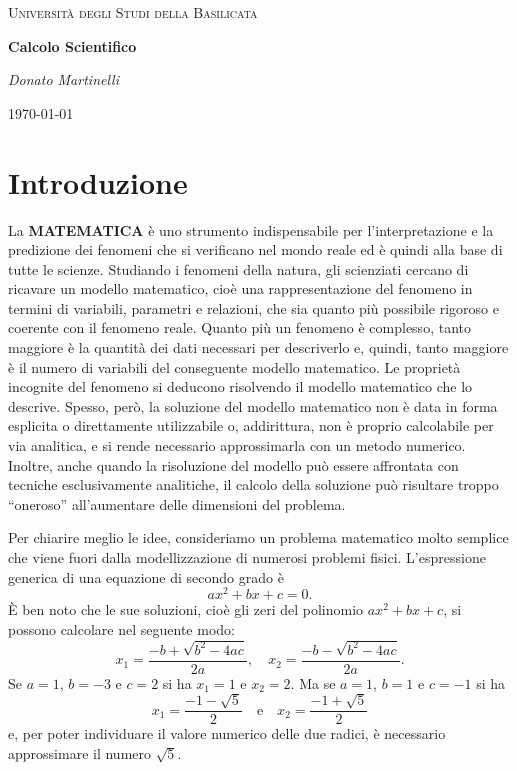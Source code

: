 \documentclass{article}
\theoremstyle{plain}
\theoremstyle{definition}
\theoremstyle{remark}
\begin{document}
\begin{titlepage}
    \centering
	{\textsc{Università degli Studi della Basilicata} \par}
	\vspace{2cm}
    {\huge\bfseries Calcolo Scientifico \par}
	\vfill
	{\Large\itshape Donato Martinelli\par}
	{\large \today\par}
\end{titlepage}

\tableofcontents

\vspace{10pt}


\section{Introduzione}


La \textbf{MATEMATICA} è uno strumento indispensabile per l'interpretazione e la predizione dei fenomeni che si verificano nel mondo reale ed è quindi alla base di tutte le scienze. Studiando i fenomeni della natura, gli scienziati cercano di ricavare un modello matematico, cioè una rappresentazione del fenomeno in termini di variabili, parametri e relazioni, che sia quanto più possibile rigoroso e coerente con il fenomeno reale. Quanto più un fenomeno è complesso, tanto maggiore è la quantità dei dati necessari per descriverlo e, quindi, tanto maggiore è il numero di variabili del conseguente modello matematico. Le proprietà incognite del fenomeno si deducono risolvendo il modello matematico che lo descrive. Spesso, però, la soluzione del modello matematico non è data in forma esplicita o direttamente utilizzabile o, addirittura, non è proprio calcolabile per via analitica, e si rende necessario approssimarla con un metodo numerico. Inoltre, anche quando la risoluzione del modello può essere affrontata con tecniche esclusivamente analitiche, il calcolo della soluzione può risultare troppo “oneroso” all'aumentare delle dimensioni del problema.

Per chiarire meglio le idee, consideriamo un problema matematico molto semplice che viene fuori dalla modellizzazione di numerosi problemi fisici. L'espressione generica di una equazione di secondo grado è
\[ ax^2 + bx + c = 0. \]
È ben noto che le sue soluzioni, cioè gli zeri del polinomio \( ax^2 + bx + c \), si possono calcolare nel seguente modo:
\[ x_1 = \frac{-b + \sqrt{b^2 - 4ac}}{2a}, \quad x_2 = \frac{-b - \sqrt{b^2 - 4ac}}{2a}. \]
Se \( a = 1 \), \( b = -3 \) e \( c = 2 \) si ha \( x_1 = 1 \) e \( x_2 = 2 \).
Ma se \( a = 1 \), \( b = 1 \) e \( c = -1 \) si ha
\[ x_1 = \frac{-1 - \sqrt{5}}{2} \quad \text{e} \quad x_2 = \frac{-1 + \sqrt{5}}{2} \]
e, per poter individuare il valore numerico delle due radici, è necessario approssimare il numero \( \sqrt{5} \).
\end{document}
